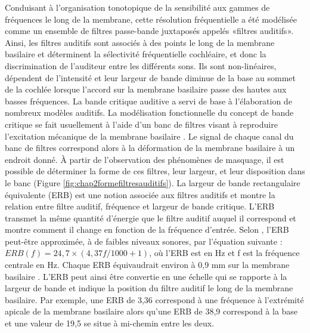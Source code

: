 Conduisant à l'organisation tonotopique de la sensibilité aux gammes de fréquences le long de la membrane, cette résolution fréquentielle a été modélisée comme un ensemble de filtres passe-bande juxtaposés appelés «filtres auditifs». 
Ainsi, les filtres auditifs sont associés à des points le long de la membrane basilaire et déterminent la sélectivité fréquentielle cochléaire, et donc la discrimination de l'auditeur entre les différents sons. 
Ils sont non-linéaires, dépendent de l'intensité et leur largeur de bande diminue de la base au sommet de la cochlée lorsque l'accord sur la membrane basilaire passe des hautes aux basses fréquences. 
La bande critique auditive a servi de base à l’élaboration de nombreux modèles auditifs. 
La modélisation fonctionnelle du concept de bande critique se fait usuellement à l’aide d’un banc de filtres visant à reproduire l’excitation mécanique de la membrane basilaire \citep{gnansia2005modele}. 
Le signal de chaque canal du banc de filtres correspond alors à la déformation de la membrane basilaire à un endroit donné. 
À partir de l’observation des phénomènes de masquage, il est possible de déterminer la forme de ces filtres, leur largeur, et leur disposition dans le banc (Figure \ref{fig:chap2formefiltresauditifs}). 
La largeur de bande rectangulaire équivalente (ERB) est une notion associée aux filtres auditifs et montre la relation entre filtre auditif, fréquence et largeur de bande critique. 
L'ERB transmet la même quantité d'énergie que le filtre auditif auquel il correspond et montre comment il change en fonction de la fréquence d'entrée. 
Selon \cite{glasberg1990derivation}, l'ERB peut-être approximée, à de faibles niveaux sonores, par l'équation suivante : $ERB(f) = 24,7 \times (4,37 f / 1000 + 1)$, où l'ERB est en Hz et f est la fréquence centrale en Hz. 
Chaque ERB équivaudrait environ à 0,9 mm sur la membrane basilaire \citep{glasberg1990derivation}. 
L'ERB peut ainsi être convertie en une échelle qui se rapporte à la largeur de bande et indique la position du filtre auditif le long de la membrane basilaire. 
Par exemple, une ERB de 3,36 correspond à une fréquence à l'extrémité apicale de la membrane basilaire alors qu'une ERB de 38,9 correspond à la base et une valeur de 19,5 se situe à mi-chemin entre les deux. 

